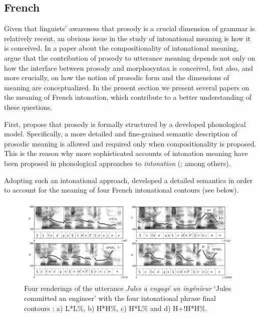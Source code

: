 \documentclass[output=paper,colorlinks,citecolor=brown]{langscibook}
\begin{document}
\subsection{French}\label{sec:04:3sub2}
Given that linguists' awareness that prosody is a crucial dimension of grammar is relatively recent, an obvious issue in the study of intonational meaning is how it is conceived. In a paper about the compositionality of intonational meaning, \citet{Portes2015IsIM} argue that the contribution of prosody to utterance meaning depends not only on how the interface between prosody and morphosyntax is conceived, but also, and more crucially, on how the notion of prosodic form and the dimensions of meaning are conceptualized. In the present section we present several papers on the meaning of French intonation, which contribute to a better understanding of these questions.

First, \citet{Portes2015IsIM} propose that prosody is formally structured by a developed phonological model. Specifically, a more detailed and fine-grained semantic description of prosodic meaning is allowed and required only when compositionality is proposed. This is the reason why more sophisticated accounts of intonation meaning have been proposed in phonological approaches to \textit{intonation} (\citealt{gussenhoven_grammar_1984, gussenhoven2014, pierrehumbert_meaning_1990, SteedmanInfoStru}; among others).

Adopting such an intonational approach, \citet{portesetal2014} developed a detailed semantics in order to account for the meaning of four French intonational contours (see  below).

\begin{figure}
\includegraphics[scale=0.25]{figures/ch10-5.jpg}
  \caption{Four renderings of the utterance \textit{Jules a engagé un ingénieur} `Jules committed an engineer' with the four intonational phrase final contours \citep[adapted from][18]{portesetal2014}: a) L*L\%, b) H*H\%, c) H*L\% and d) H+!H*H\%.}
  \label{fig5}
\end{figure}
\end{document}
